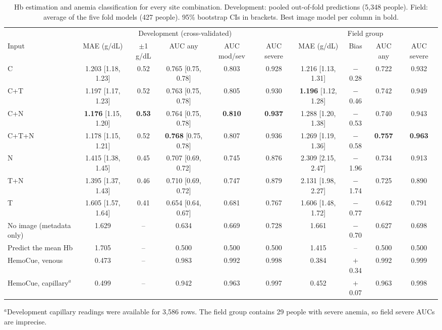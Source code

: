 \documentclass[10pt,a4paper,twocolumn]{article}
\begin{document}
\begin{table}[t]
\centering\small
\caption{Hb estimation and anemia classification for every site combination. Development: pooled out-of-fold predictions (5,348 people). Field: average of the five fold models (427 people). 95\% bootstrap CIs in brackets. Best image model per column in bold.}
\label{tab:overall}
\setlength{\tabcolsep}{4.2pt}
\begin{adjustbox}{max width=\textwidth}
\begin{tabular}{@{}l ccccc @{\hskip 10pt} cccc@{}}
\toprule
 & \multicolumn{5}{c}{Development (cross-validated)} & \multicolumn{4}{c}{Field group} \\
\cmidrule(lr){2-6}\cmidrule(l){7-10}
Input & MAE (g/dL) & $\pm$1 g/dL & AUC any & AUC mod/sev & AUC severe & MAE (g/dL) & Bias & AUC any & AUC severe \\
\midrule
C       & 1.203 [1.18, 1.23] & 0.52 & 0.765 [0.75, 0.78] & 0.803 & 0.928 & 1.216 [1.13, 1.31] & $-$0.28 & 0.722 & 0.932 \\
C+T     & 1.197 [1.17, 1.23] & 0.52 & 0.763 [0.75, 0.78] & 0.805 & 0.930 & \textbf{1.196} [1.12, 1.28] & $-$0.46 & 0.742 & 0.949 \\
C+N     & \textbf{1.176} [1.15, 1.20] & \textbf{0.53} & 0.764 [0.75, 0.78] & \textbf{0.810} & \textbf{0.937} & 1.288 [1.20, 1.38] & $-$0.53 & 0.740 & 0.943 \\
C+T+N   & 1.178 [1.15, 1.21] & 0.52 & \textbf{0.768} [0.75, 0.78] & 0.807 & 0.936 & 1.269 [1.19, 1.36] & $-$0.58 & \textbf{0.757} & \textbf{0.963} \\
N       & 1.415 [1.38, 1.45] & 0.45 & 0.707 [0.69, 0.72] & 0.745 & 0.876 & 2.309 [2.15, 2.47] & $-$1.96 & 0.734 & 0.913 \\
T+N     & 1.395 [1.37, 1.43] & 0.46 & 0.710 [0.69, 0.72] & 0.747 & 0.879 & 2.131 [1.98, 2.27] & $-$1.74 & 0.725 & 0.890 \\
T       & 1.605 [1.57, 1.64] & 0.41 & 0.654 [0.64, 0.67] & 0.681 & 0.767 & 1.606 [1.48, 1.72] & $-$0.77 & 0.642 & 0.791 \\
\midrule
No image (metadata only) & 1.629 & -- & 0.634 & 0.669 & 0.728 & 1.661 & $-$0.70 & 0.627 & 0.698 \\
Predict the mean Hb & 1.705 & -- & 0.500 & 0.500 & 0.500 & 1.415 & -- & 0.500 & 0.500 \\
HemoCue, venous & 0.473 & -- & 0.983 & 0.992 & 0.998 & 0.384 & $+$0.34 & 0.992 & 0.999 \\
HemoCue, capillary$^{a}$ & 0.499 & -- & 0.942 & 0.963 & 0.997 & 0.452 & $+$0.07 & 0.963 & 0.998 \\
\bottomrule
\end{tabular}
\end{adjustbox}
\par\vspace{2pt}\raggedright\footnotesize $^{a}$Development capillary readings were available for 3,586 rows. The field group contains 29 people with severe anemia, so field severe AUCs are imprecise.
\end{table}
\end{document}
